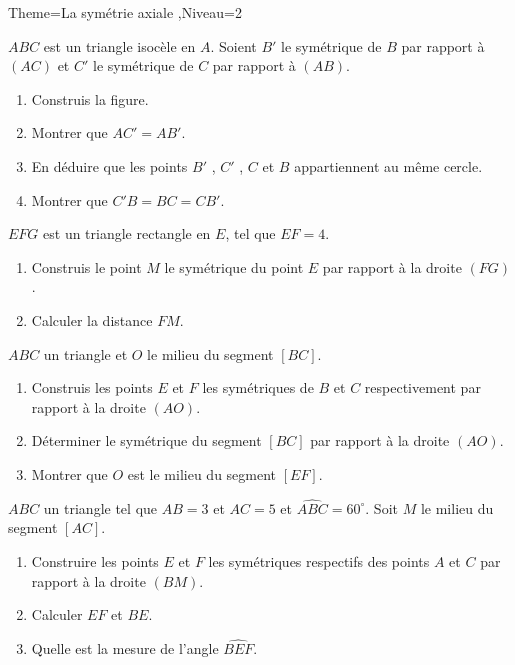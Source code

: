 \documentclass[a4paper,12pt]{article}
\begin{document}
\begin{Maquette}[Fiche]{Theme=La symétrie axiale ,Niveau=2}
\begin{exercice}
$ABC$ est un triangle isocèle en $A$.
Soient $B'$ le symétrique de $B$ par rapport à $(AC)$ et $C'$ le symétrique de $C$ par rapport à $(AB)$.
\begin{enumerate}
\item Construis la figure.
\item Montrer que $AC'=AB'$.
\item En déduire que les points $B'$ , $C'$ , $C$ et $B$ appartiennent au même cercle.
\item Montrer que $C'B=BC=CB'$.
\end{enumerate}
\end{exercice}

\begin{exercice}
$EFG$ est un triangle rectangle en $E$, tel que $EF=4$.
\begin{enumerate}
\item Construis le point $M$ le symétrique du point $E$ par rapport à la droite $(FG)$.
\item Calculer la distance $FM$.
\end{enumerate}
\end{exercice}

\begin{exercice}
$ABC$ un triangle et $O$ le milieu du segment $[BC]$.
\begin{enumerate}
\item Construis les points $E$ et $F$ les symétriques de $B$ et $C$ respectivement par rapport à la droite $(AO)$.
\item Déterminer le symétrique du segment $[BC]$ par rapport à la droite $(AO)$.
\item Montrer que $O$ est le milieu du segment $[EF]$.
\end{enumerate}
\end{exercice}

\begin{exercice}
$ABC$ un triangle tel que $AB=3$ et $AC=5$ et $\widehat{ABC}=60^{\circ}$. Soit $M$ le milieu du segment $[AC]$.
\begin{enumerate}
\item Construire les points $E$ et $F$ les symétriques respectifs des points $A$ et $C$ par rapport à la droite $(BM)$.
\item Calculer $EF$ et $BE$.
\item Quelle est la mesure de l'angle $\widehat{BEF}$.
\end{enumerate}
\end{exercice}


\end{Maquette}
\end{document}
